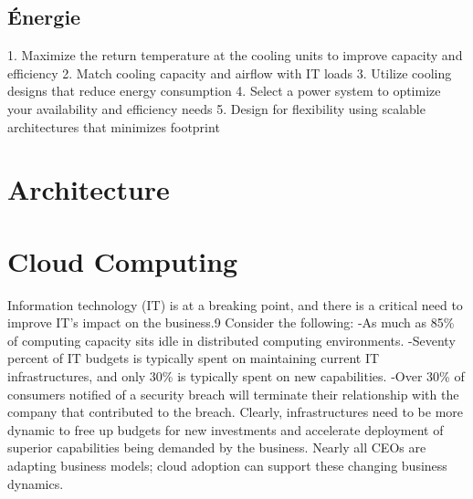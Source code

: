 \subsection{Énergie}
1. Maximize the return temperature at the cooling units to improve capacity and efficiency
2. Match cooling capacity and airflow with IT loads
3. Utilize cooling designs that reduce energy consumption
4. Select a power system to optimize your availability and efficiency needs
5. Design for flexibility using scalable architectures that minimizes footprint

\section{Architecture}

\section{Cloud Computing}

Information technology (IT) is at a breaking point, and there is a critical need to improve IT's impact on the business.9
Consider the following:
 -As much as 85\% of computing capacity sits idle in distributed computing environments.
 -Seventy percent of IT budgets is typically spent on maintaining current IT infrastructures, and only 30\% is typically spent on new capabilities.
 -Over 30\% of consumers notified of a security breach will terminate their relationship with the company that contributed to the breach.
Clearly, infrastructures need to be more dynamic to free up budgets for new investments and accelerate deployment of superior capabilities being demanded by the business. Nearly all CEOs are adapting business models; cloud adoption can support these changing business dynamics.